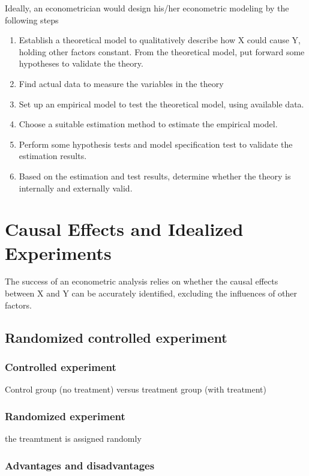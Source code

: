 \documentclass[a4paper,11pt]{article}
\begin{document}
Ideally, an econometrician would design his/her econometric modeling
by the following steps

\begin{enumerate}
\item Establish a theoretical model to qualitatively describe how X could
cause Y, holding other factors constant. From the theoretical
model, put forward some hypotheses to validate the theory.
\item Find actual data to measure the variables in the theory
\item Set up an empirical model to test the theoretical model, using
available data.
\item Choose a suitable estimation method to estimate the empirical model.
\item Perform some hypothesis tests and model specification test to
validate the estimation results.
\item Based on the estimation and test results, determine whether the theory
is internally and externally valid.
\end{enumerate}


\section{Causal Effects and Idealized Experiments}
\label{sec:org8947717}

The success of an econometric analysis relies on whether the causal
effects between X and Y can be accurately identified, excluding the
influences of other factors.

\subsection{Randomized controlled experiment}
\label{sec:org86f8071}

\subsubsection*{Controlled experiment}
\label{sec:orgfd31a67}

Control group (no treatment) versus treatment group (with treatment)

\subsubsection*{Randomized experiment}
\label{sec:org1e3b9fa}
the treamtment is assigned randomly

\subsubsection*{Advantages and disadvantages}
\label{sec:org9cea44f}
\end{document}
